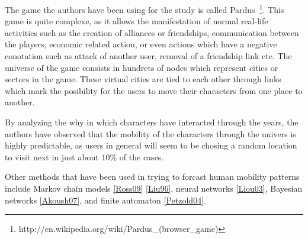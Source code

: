 The game the authors have been using for the study is called
Pardus~\footnote{http://en.wikipedia.org/wiki/Pardus\_(browser\_game)}. This
game is quite complexe, as it allows the manifestation of normal real-life
activities such as the creation of alliances or friendships, communication
between the players, economic related action, or even actions which have a
negative conotation such as attack of another user, removal of a friendship
link etc. The universe of the game consists in hundrets of nodes which represent
cities or sectors in the game. These virtual cities are tied to each other
through links which mark the posibility for the users to move their characters
from one place to another.

By analyzing the why in which characters have interacted through the years, the
authors have observed that the mobility of the characters through the univers is
highly predictable, as users in general will seem to be chosing a random
location to visit next in just about $10\%$ of the cases.

Other methods that have been used in trying to forcast human mobility patterns
include Markov chain models \ref{Ross09} \ref{Liu96}, neural networks
\ref{Liou03}, Bayesian networks \ref{Akoush07}, and finite automaton
\ref{Petzold04}.


